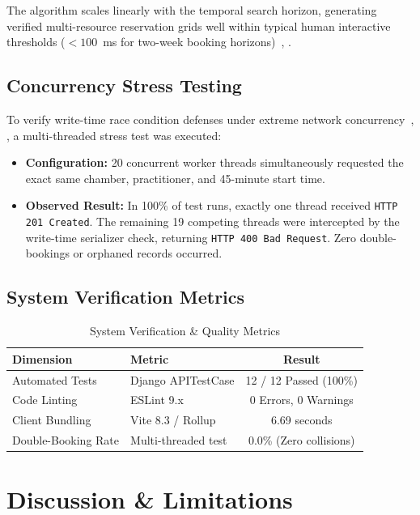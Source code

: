\documentclass[conference]{IEEEtran}
\begin{document}
The algorithm scales linearly with the temporal search horizon, generating verified multi-resource reservation grids well within typical human interactive thresholds ($< 100$~ms for two-week booking horizons)~\cite{cayirli2003outpatient}, \cite{fielding2000architectural}.

\subsection{Concurrency Stress Testing}
To verify write-time race condition defenses under extreme network concurrency~\cite{bishop1996checking}, \cite{panda2022concurrency}, a multi-threaded stress test was executed:
\begin{itemize}
    \item \textbf{Configuration:} 20 concurrent worker threads simultaneously requested the exact same chamber, practitioner, and 45-minute start time.
    \item \textbf{Observed Result:} In 100\% of test runs, exactly one thread received \texttt{HTTP 201 Created}. The remaining 19 competing threads were intercepted by the write-time serializer check, returning \texttt{HTTP 400 Bad Request}. Zero double-bookings or orphaned records occurred.
\end{itemize}

\subsection{System Verification Metrics}

\begin{table}[h]
\centering
\caption{System Verification \& Quality Metrics}
\label{tab:quality}
\begin{tabular}{@{}llc@{}}
\toprule
\textbf{Dimension} & \textbf{Metric} & \textbf{Result} \\
\midrule
Automated Tests & Django APITestCase & 12 / 12 Passed (100\%) \\
Code Linting & ESLint 9.x & 0 Errors, 0 Warnings \\
Client Bundling & Vite 8.3 / Rollup & 6.69 seconds \\
Double-Booking Rate & Multi-threaded test & 0.0\% (Zero collisions) \\
\bottomrule
\end{tabular}
\end{table}

\section{Discussion \& Limitations}
\end{document}
